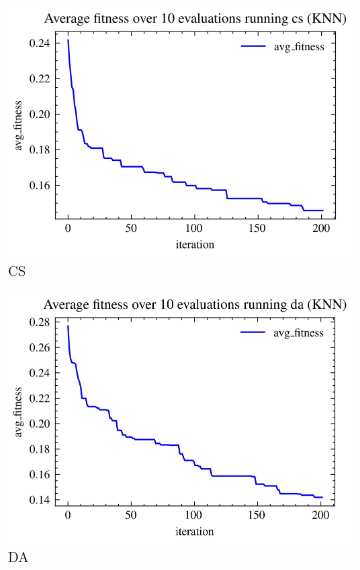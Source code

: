 \begin{figure}[H]
    \begin{subfigure}[b]{0.3\textwidth}
        \centering
        \includegraphics[width=\textwidth]{imagenes/binary_knn_fitness/KNN_fitness_over_10_evaluations_cs_binary_breast-cancer.jpg}
        \caption{CS}
        \label{fig:sub4}
    \end{subfigure}
    \hfill
    \begin{subfigure}[b]{0.3\textwidth}
        \centering
        \includegraphics[width=\textwidth]{imagenes/binary_knn_fitness/KNN_fitness_over_10_evaluations_da_binary_breast-cancer.jpg}
        \caption{DA}
        \label{fig:sub5}
    \end{subfigure}
    \hfill
    \begin{subfigure}[b]{0.3\textwidth}
        \centering

\end{subfigure}
\end{figure}
